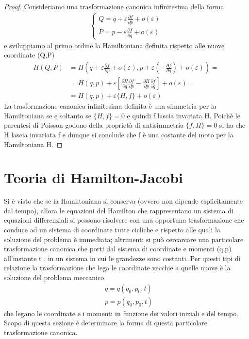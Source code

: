 \begin{proof}
Consideriamo una trasformazione canonica infinitesima della forma
\begin{align*}
	\left\{\begin{array}{l}
Q=q+\varepsilon \frac{\partial f}{\partial p}+o(\varepsilon) \\
P=p-\varepsilon \frac{\partial f}{\partial q}+o(\varepsilon)
\end{array}\right.
\end{align*}
e sviluppiamo al primo ordine la Hamiltoniana definita rispetto alle nuove coordinate (Q,P)
\begin{align*}
H(Q, P) & =H\left(q+\varepsilon \frac{\partial f}{\partial p}+o(\varepsilon), p+\varepsilon\left(-\frac{\partial f}{\partial q}\right)+o(\varepsilon)\right)= \\[0.1in]
& =H(q, p)+\varepsilon\left[\frac{\partial H}{\partial q} \frac{\partial f}{\partial p}-\frac{\partial H}{\partial p} \frac{\partial f}{\partial q}\right]+o(\varepsilon)= \\[0.1in]
& =H(q, p)+\varepsilon \{ H, f\}+o(\varepsilon)
\end{align*}
La trasformazione canonica infinitesima definita \`{e} una simmetria per la Hamiltoniana se e soltanto se $\{ H,f \} = 0$ e quindi f lascia invariata H. Poich\`{e} le parentesi di Poisson godono della propriet\`{a} di antisimmetria $\{f,H \} = 0$ si ha che H lascia invariata f e dunque si conclude che f \`{e} una costante del moto per la Hamiltoniana H.
	
\end{proof}

\section{Teoria di Hamilton-Jacobi}

Si \`{e} visto che se la Hamiltoniana si conserva (ovvero non dipende esplicitamente dal tempo), allora le equazioni del Hamilton che rappresentano un sistema di equazioni differenziali si possono risolvere con una opportuna trasformazione che conduce ad un sistema di coordinate tutte cicliche e rispetto alle quali la soluzione del problema \`{e} immediata; altrimenti si pu\`{o} cercarcare una particolare trasformazione canonica che porti dal sistema di coordinate e momenti (q,p) all'instante t , in un sistema in cui le grandezze sono costanti. Per questi tipi di relazione la trasformazione che lega le coordinate vecchie a quelle nuove \`{e} la soluzione del problema meccanico
\begin{equation}
	\begin{aligned}
& q=q\left(q_0, p_0, t\right) \\
& p=p\left(q_0, p_0, t\right)
\end{aligned}
\end{equation}
che legano le coordinate e i momenti in funzione dei valori iniziali e del tempo.\newline
Scopo di questa sezione \`{e} determinare la forma di questa particolare trasformazione canonica.

